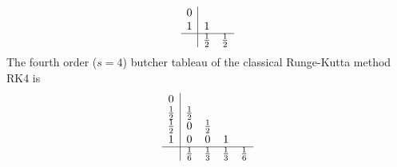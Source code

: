 \begin{equation}
    \begin{array}{c|cc}
        0 &  &   \\
        1 & 1 &  \\
        \hline 
        & \frac{1}{2} & \frac{1}{2} 
        \end{array}
    \label{eq:appendix_heun_butcher}
\end{equation} 
The fourth order ($s=4$) butcher tableau of the classical Runge-Kutta method RK4 \cite{griffiths2010} is 
\begin{equation}
    \begin{array}{c|cccc}
        0 &  &  &  &  \\
        \frac{1}{2} & \frac{1}{2} &  &  &  \\
        \frac{1}{2} & 0 & \frac{1}{2} & & \\
        1 & 0 & 0 & 1 &  \\
        \hline 
        & \frac{1}{6} & \frac{1}{3} & \frac{1}{3} & \frac{1}{6}
    \end{array}
    \label{eq:appendix_rk4_butcher}
\end{equation}